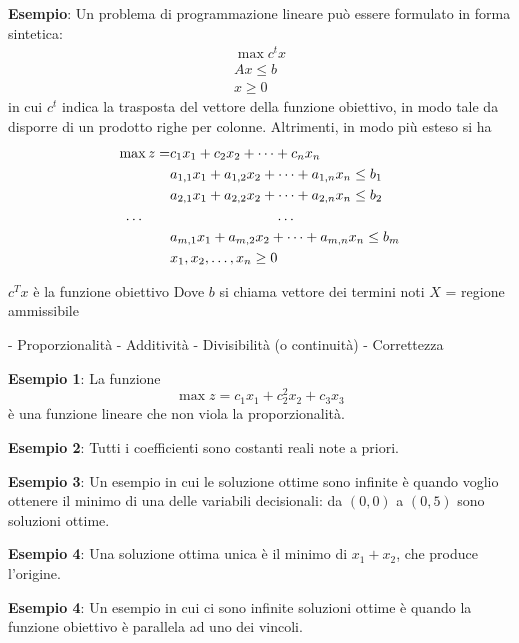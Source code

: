 \documentclass[a4paper]{extarticle}
\begin{document}
\vspace{2em}
\noindent
\textbf{Esempio}: Un problema di programmazione lineare può essere formulato in forma sintetica:
\begin{align}
    \max c{^t} x\\
    A x \leq b\\
    x \geq 0
\end{align}
in cui $c{^t}$ indica la trasposta del vettore della funzione obiettivo, in modo tale da disporre di un prodotto righe per colonne. Altrimenti, in modo più esteso si ha
\begin{align}
    \max z =&c_1x_1+c_2x_2+\dots+c_nx_n\\
            &a_{1,1}x_1+a_{1,2}x_2+\dots+a_{1,n}x_n \leq b_1\\
            &a_{2,1}x_1+a_{2,2}x_2+\dots+a_{2,n}x_n \leq b_2\\
    \dots \hspace{2em} & \hspace{7.5em} \dots\\
            & a_{m,1}x_1+a_{m,2}x_2+\dots+a_{m,n}x_n \leq b_m\\
    & x_1,x_2,\dots,x_n \geq 0
\end{align}


$c^T x$ è la funzione obiettivo
Dove $b$ si chiama vettore dei termini noti
$X$ = regione ammissibile

- Proporzionalità
- Additività
- Divisibilità (o continuità)
- Correttezza


\vspace{1em}
\noindent
\textbf{Esempio 1}: La funzione
\[\max z = c_1 x_1 + c_2^2 x_2 + c_3 x_3\]
è una funzione lineare che non viola la proporzionalità.


\vspace{1em}
\noindent
\textbf{Esempio 2}: Tutti i coefficienti sono costanti reali note a priori.

\vspace{1em}
\noindent
\textbf{Esempio 3}: Un esempio in cui le soluzione ottime sono infinite è quando voglio ottenere il minimo di una delle variabili decisionali: da $(0,0)$ a $(0,5)$ sono soluzioni ottime.

\vspace{1em}
\noindent
\textbf{Esempio 4}: Una soluzione ottima unica è il minimo di $x_1+x_2$, che produce l'origine.


\vspace{1em}
\noindent
\textbf{Esempio 4}: Un esempio in cui ci sono infinite soluzioni ottime è  quando la funzione obiettivo è parallela ad uno dei vincoli.

\end{document}
